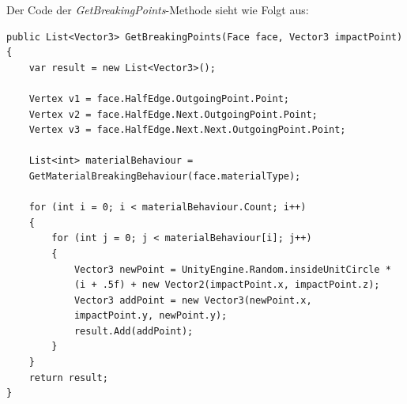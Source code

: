 Der Code der \textit{GetBreakingPoints}-Methode sieht wie Folgt aus:
\begin{lstlisting}
public List<Vector3> GetBreakingPoints(Face face, Vector3 impactPoint)
{
	var result = new List<Vector3>();
	
	Vertex v1 = face.HalfEdge.OutgoingPoint.Point;
	Vertex v2 = face.HalfEdge.Next.OutgoingPoint.Point;
	Vertex v3 = face.HalfEdge.Next.Next.OutgoingPoint.Point;
	
	List<int> materialBehaviour =
	GetMaterialBreakingBehaviour(face.materialType);
	
	for (int i = 0; i < materialBehaviour.Count; i++)
	{
		for (int j = 0; j < materialBehaviour[i]; j++)
		{
			Vector3 newPoint = UnityEngine.Random.insideUnitCircle *
			(i + .5f) + new Vector2(impactPoint.x, impactPoint.z);
			Vector3 addPoint = new Vector3(newPoint.x,
			impactPoint.y, newPoint.y);
			result.Add(addPoint);
		}
	}
	return result;
}

\end{lstlisting}
